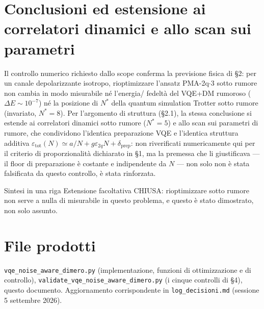 \documentclass[11pt,a4paper]{article}
\begin{document}
\section{Conclusioni ed estensione ai correlatori dinamici e allo scan sui parametri}

Il controllo numerico richiesto dallo scope conferma la previsione fisica
di §2: per un canale depolarizzante isotropo, rioptimizzare l'ansatz
PMA-2q$\cdot$3 sotto rumore non cambia in modo misurabile né l'energia/
fedeltà del VQE+DM rumoroso ($\Delta E\sim10^{-7}$) né la posizione di
$N^*$ della quantum simulation Trotter sotto rumore (invariato, $N^*=8$).
Per l'argomento di struttura (§2.1), la stessa conclusione si estende ai
correlatori dinamici sotto rumore ($N^*=5$) e allo scan sui parametri di
rumore, che condividono l'identica preparazione VQE
e l'identica struttura additiva
$\varepsilon_\text{tot}(N)\simeq a/N+g\varepsilon_{2q}N+\delta_\text{prep}$:
non riverificati numericamente qui per il criterio di proporzionalità
dichiarato in §1, ma la premessa che li giustificava --- il floor di
preparazione è costante e indipendente da $N$ --- non solo non è stata
falsificata da questo controllo, è stata rinforzata.

\begin{okbox}{Sintesi in una riga}
Estensione facoltativa CHIUSA: rioptimizzare sotto rumore non serve a
nulla di misurabile in questo problema, e questo è stato dimostrato, non
solo assunto.
\end{okbox}

\section*{File prodotti}

\texttt{vqe\_noise\_aware\_dimero.py} (implementazione, funzioni di
ottimizzazione e di controllo), \texttt{validate\_vqe\_noise\_aware\_dimero.py}
(i cinque controlli di §4), questo documento. Aggiornamento corrispondente
in \texttt{log\_decisioni.md} (sessione 5 settembre 2026).
\end{document}

